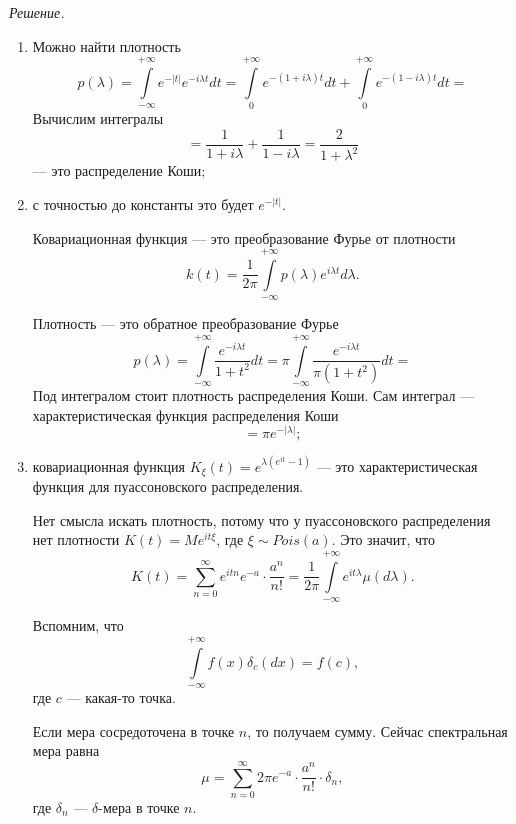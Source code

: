 \textit{Решение.}
\begin{enumerate}[label=\alph*)]
  \item Можно найти плотность
  $$p \left( \lambda \right) =
    \int \limits_{-\infty }^{+\infty } e^{-\left| t \right| } e^{-i \lambda t} dt =
    \int \limits_0^{+\infty } e^{-\left( 1 + i \lambda \right) t} dt +
    \int \limits_0^{+\infty } e^{-\left( 1 - i \lambda \right) t} dt =$$
  Вычислим интегралы
  $$= \frac{1}{1 + i \lambda } + \frac{1}{1 - i \lambda } =
    \frac{2}{1 + \lambda^2}$$
  --- это распределение Коши;
  \item с точностью до константы это будет $e^{-\left| t \right| }$.

  Ковариационная функция --- это преобразование Фурье от плотности
  $$k \left( t \right) =
    \frac{1}{2 \pi }
    \int \limits_{-\infty }^{+\infty } p \left( \lambda \right) e^{i \lambda t} d \lambda.$$

  Плотность --- это обратное преобразование Фурье
  $$p \left( \lambda \right) =
    \int \limits_{-\infty }^{+\infty } \frac{e^{-i \lambda t}}{1 + t^2} dt =
    \pi
    \int \limits_{-\infty }^{+\infty } \frac{e^{-i \lambda t}}{ \pi \left( 1 + t^2 \right) } dt =$$
  Под интегралом стоит плотность распределения Коши.
  Сам интеграл --- характеристическая функция распределения Коши
  $$= \pi e^{-\left| \lambda \right| };$$
  \item ковариационная функция
  $K_{ \xi } \left( t \right) = e^{ \lambda \left( e^{it} - 1 \right) }$ ---
  это характеристическая функция для пуассоновского распределения.

  Нет смысла искать плотность,
  потому что у пуассоновского распределения нет плотности $K \left( t \right) = Me^{it \xi }$,
  где $ \xi \sim Pois \left( a \right) $.
  Это значит, что
  $$K \left( t \right) =
    \sum \limits_{n = 0}^{ \infty } e^{itn} e^{-a} \cdot \frac{a^n}{n!} =
    \frac{1}{2 \pi }
    \int \limits_{-\infty }^{+\infty } e^{it \lambda } \mu \left( d \lambda \right).$$

  Вспомним, что
  $$ \int \limits_{-\infty }^{+\infty } f \left( x \right) \delta_c \left( dx \right) =
    f \left( c \right),$$
  где $c$ --- какая-то точка.

  Если мера сосредоточена в точке $n$, то получаем сумму.
  Сейчас спектральная мера равна
  $$ \mu =
    \sum \limits_{n = 0}^{ \infty } 2 \pi e^{-a} \cdot \frac{a^n}{n!} \cdot \delta_n,$$
  где $ \delta_n$ --- $ \delta $-мера в точке $n$.
\end{enumerate}

